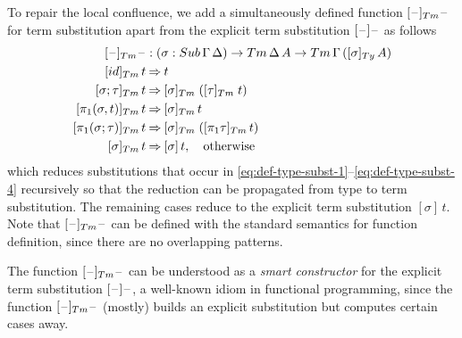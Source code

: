 \documentclass[a4paper,UKenglish,numberwithinsect,cleveref,thm-restate]{lipics-v2021}
\begin{document}
To repair the local confluence, we add a simultaneously defined function $[\blank]_{\Tm}\blank$ for term substitution apart from the explicit term substitution $[\mathord{\hspace{1pt}\text{--}\hspace{1pt}}]\mathord{\hspace{1pt}\text{--}\hspace{1pt}}$ as follows
\begin{alignat*}{3}
  [\blank]_{\Tm}\blank & : (\sigma : \Sub\,\Gamma\,\Delta) \to \Tm\,\Delta\,A \to \Tm\,\Gamma\,([\sigma]_{\Ty}\,A) \\
[ \idS ]_{\Tm}\,t          & \reduce t \\
[ \sigma ; \tau ]_{\Tm}\,t & \reduce [ \sigma ]_{\Tm}\;([ \tau ]_{\Tm}\;t) \\
[ \pi_1(\sigma, t) ]_{\Tm}\,t & \reduce [\sigma]_\Tm\,t \\
[ \pi_1(\sigma; \tau) ]_{\Tm}\,t & \reduce [\sigma]_\Tm\; ([\pi_1\tau]_\Tm \,t) \\
[ \sigma ]_{\Tm}\,t        & \reduce [ \sigma ]\,t, \quad \text{otherwise}
\end{alignat*}
which reduces substitutions that occur in \eqref{eq:def-type-subst-1}--\eqref{eq:def-type-subst-4} recursively so that the reduction can be propagated from type to term substitution.
The remaining cases reduce to the explicit term substitution $[\sigma]\,t$.
Note that $[\blank]_{\Tm}\blank$ can be defined with the standard semantics for function definition, since there are no overlapping patterns.
\begin{remark}
  The function $[\blank]_{\Tm}\blank$ can be understood as a \emph{smart constructor} for the explicit term substitution $[\mathord{\hspace{1pt}\text{--}\hspace{1pt}}]\mathord{\hspace{1pt}\text{--}\hspace{1pt}}$, a well-known idiom in functional programming, since the function $[\blank]_{\Tm}\blank$ (mostly) builds an explicit substitution but computes certain cases away.
\end{remark}
\end{document}
